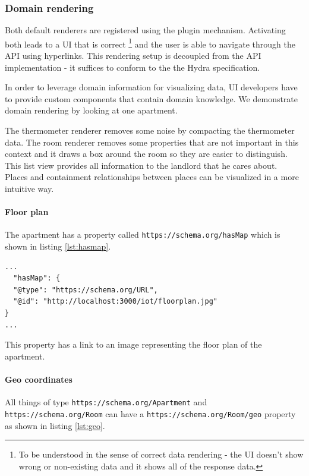 \subsubsection{Domain rendering}
Both default renderers are registered using the plugin mechanism. Activating both leads to a UI that is correct \footnote{To be understood in the sense of correct data rendering - the UI doesn't show wrong or non-existing data and it shows all of the response data.} and the user is able to navigate through the API using hyperlinks. This rendering setup is decoupled from the API implementation - it suffices to conform to the the Hydra specification.

In order to leverage domain information for visualizing data, UI developers have to provide custom components that contain domain knowledge. We demonstrate domain rendering by looking at one apartment.

The thermometer renderer removes some noise by compacting the thermometer data. The room renderer removes some properties that are not important in this context and it draws a box around the room so they are easier to distinguish. This list view provides all information to the landlord that he cares about. \\
Places and containment relationships between places can be visualized in a more intuitive way.

\paragraph{Floor plan}
The apartment has a property called \lstinline{https://schema.org/hasMap} which is shown in listing \ref{lst:hasmap}.

\lstset{language=JSON}
\begin{lstlisting}[caption=The \lstinline{hasMap} property of apartment \lstinline{/apartments/0}., label={lst:hasmap}]
...
  "hasMap": {
  "@type": "https://schema.org/URL",
  "@id": "http://localhost:3000/iot/floorplan.jpg"
}
...
\end{lstlisting}

This property has a link to an image representing the floor plan of the apartment.

\paragraph{Geo coordinates}
All things of type \lstinline{https://schema.org/Apartment} and \lstinline{https://schema.org/Room} can have a \lstinline{https://schema.org/Room/geo} property as shown in listing \ref{lst:geo}.


